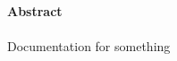\documentclass[twoside,10pt]{book}
\numberwithin{equation}{chapter} %
\numberwithin{figure}{chapter}
\begin{document}
	\setcounter{page}{1}
	

	\newpage\null\thispagestyle{empty}\newpage
	\paragraph{ \vspace{3.5cm}}\begin{center}\end{center}



\noindent \textbf{ {\Large Abstract}}

\paragraph{}
Documentation for something


\newpage
\paragraph{ \vspace{3.5cm}}\begin{center}\end{center}

\tableofcontents



\cleardoublepage {}

\nocite{*}
{}

\end{document}
